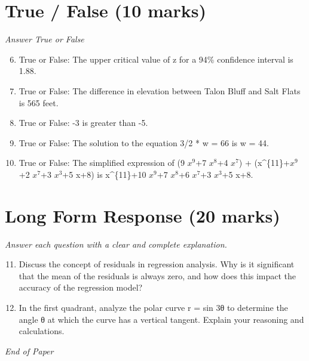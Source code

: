 \documentclass[12pt]{article}
\begin{document}
\section*{True / False (10 marks)}
\textit{Answer True or False}
\begin{enumerate}[label=\arabic*.]
\setcounter{enumi}{5}
\item True or False: The upper critical value of z for a 94\% confidence interval is 1.88.
\item True or False: The difference in elevation between Talon Bluff and Salt Flats is 565 feet.
\item True or False: -3 is greater than -5.
\item True or False: The solution to the equation 3/2 * w = 66 is w = 44.
\item True or False: The simplified expression of (9 $x^9$+7 $x^8$+4 $x^7$) + (x^\{11\}+$x^9$+2 $x^7$+3 $x^3$+5 x+8) is x^\{11\}+10 $x^9$+7 $x^8$+6 $x^7$+3 $x^3$+5 x+8.
\end{enumerate}

\section*{Long Form Response (20 marks)}
\textit{Answer each question with a clear and complete explanation.}
\begin{enumerate}[label=\arabic*.]
\setcounter{enumi}{10}
\item Discuss the concept of residuals in regression analysis. Why is it significant that the mean of the residuals is always zero, and how does this impact the accuracy of the regression model?
\item In the first quadrant, analyze the polar curve r = sin 3θ to determine the angle θ at which the curve has a vertical tangent. Explain your reasoning and calculations.
\end{enumerate}

\vfill
\noindent\textit{End of Paper}
\end{document}
